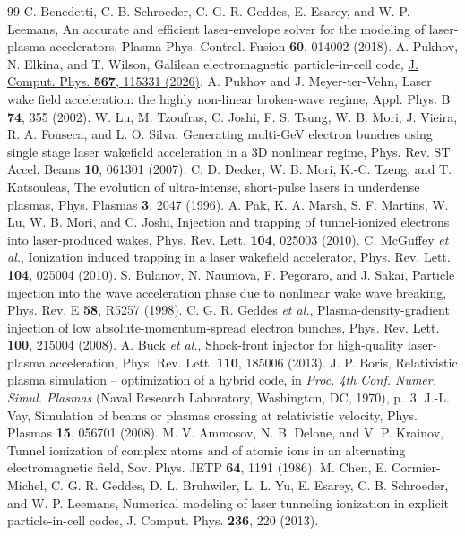 \documentclass[preprint,12pt]{elsarticle}
\begin{document}
\begin{thebibliography}{99}
 C. Benedetti, C. B. Schroeder, C. G. R. Geddes, E. Esarey, and W. P. Leemans, An accurate and efficient laser-envelope solver for the modeling of laser-plasma accelerators, Plasma Phys. Control. Fusion \textbf{60}, 014002 (2018).
 A. Pukhov, N. Elkina, and T. Wilson, Galilean electromagnetic particle-in-cell code, \href{https://doi.org/10.1016/j.jcp.2026.115331}{J. Comput. Phys. \textbf{567}, 115331 (2026)}.
 A. Pukhov and J. Meyer-ter-Vehn, Laser wake field acceleration: the highly non-linear broken-wave regime, Appl. Phys. B \textbf{74}, 355 (2002).
 W. Lu, M. Tzoufras, C. Joshi, F. S. Tsung, W. B. Mori, J. Vieira, R. A. Fonseca, and L. O. Silva, Generating multi-GeV electron bunches using single stage laser wakefield acceleration in a 3D nonlinear regime, Phys. Rev. ST Accel. Beams \textbf{10}, 061301 (2007).
 C. D. Decker, W. B. Mori, K.-C. Tzeng, and T. Katsouleas, The evolution of ultra-intense, short-pulse lasers in underdense plasmas, Phys. Plasmas \textbf{3}, 2047 (1996).
 A. Pak, K. A. Marsh, S. F. Martins, W. Lu, W. B. Mori, and C. Joshi, Injection and trapping of tunnel-ionized electrons into laser-produced wakes, Phys. Rev. Lett. \textbf{104}, 025003 (2010).
 C. McGuffey \textit{et al.}, Ionization induced trapping in a laser wakefield accelerator, Phys. Rev. Lett. \textbf{104}, 025004 (2010).
 S. Bulanov, N. Naumova, F. Pegoraro, and J. Sakai, Particle injection into the wave acceleration phase due to nonlinear wake wave breaking, Phys. Rev. E \textbf{58}, R5257 (1998).
 C. G. R. Geddes \textit{et al.}, Plasma-density-gradient injection of low absolute-momentum-spread electron bunches, Phys. Rev. Lett. \textbf{100}, 215004 (2008).
 A. Buck \textit{et al.}, Shock-front injector for high-quality laser-plasma acceleration, Phys. Rev. Lett. \textbf{110}, 185006 (2013).
 J. P. Boris, Relativistic plasma simulation -- optimization of a hybrid code, in \textit{Proc. 4th Conf. Numer. Simul. Plasmas} (Naval Research Laboratory, Washington, DC, 1970), p.~3.
 J.-L. Vay, Simulation of beams or plasmas crossing at relativistic velocity, Phys. Plasmas \textbf{15}, 056701 (2008).
 M. V. Ammosov, N. B. Delone, and V. P. Krainov, Tunnel ionization of complex atoms and of atomic ions in an alternating electromagnetic field, Sov. Phys. JETP \textbf{64}, 1191 (1986).
 M. Chen, E. Cormier-Michel, C. G. R. Geddes, D. L. Bruhwiler, L. L. Yu, E. Esarey, C. B. Schroeder, and W. P. Leemans, Numerical modeling of laser tunneling ionization in explicit particle-in-cell codes, J. Comput. Phys. \textbf{236}, 220 (2013).

\end{thebibliography}
\end{document}
